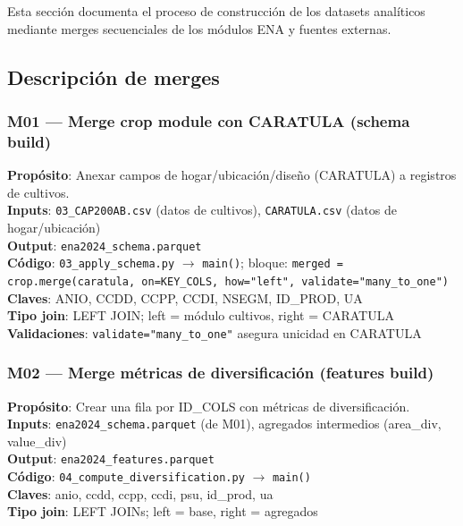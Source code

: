\documentclass[11pt,a4paper]{article}
\begin{document}
Esta sección documenta el proceso de construcción de los datasets analíticos mediante merges secuenciales de los módulos ENA y fuentes externas.

\subsection{Descripción de merges}

\subsubsection{M01 — Merge crop module con CARATULA (schema build)}
\textbf{Propósito}: Anexar campos de hogar/ubicación/diseño (CARATULA) a registros de cultivos.\\
\textbf{Inputs}: \texttt{03\_CAP200AB.csv} (datos de cultivos), \texttt{CARATULA.csv} (datos de hogar/ubicación)\\
\textbf{Output}: \texttt{ena2024\_schema.parquet}\\
\textbf{Código}: \texttt{03\_apply\_schema.py} $\to$ \texttt{main()}; bloque: \texttt{merged = crop.merge(caratula, on=KEY\_COLS, how="left", validate="many\_to\_one")}\\
\textbf{Claves}: ANIO, CCDD, CCPP, CCDI, NSEGM, ID\_PROD, UA\\
\textbf{Tipo join}: LEFT JOIN; left = módulo cultivos, right = CARATULA\\
\textbf{Validaciones}: \texttt{validate="many\_to\_one"} asegura unicidad en CARATULA

\subsubsection{M02 — Merge métricas de diversificación (features build)}
\textbf{Propósito}: Crear una fila por ID\_COLS con métricas de diversificación.\\
\textbf{Inputs}: \texttt{ena2024\_schema.parquet} (de M01), agregados intermedios (area\_div, value\_div)\\
\textbf{Output}: \texttt{ena2024\_features.parquet}\\
\textbf{Código}: \texttt{04\_compute\_diversification.py} $\to$ \texttt{main()}\\
\textbf{Claves}: anio, ccdd, ccpp, ccdi, psu, id\_prod, ua\\
\textbf{Tipo join}: LEFT JOINs; left = base, right = agregados
\end{document}
